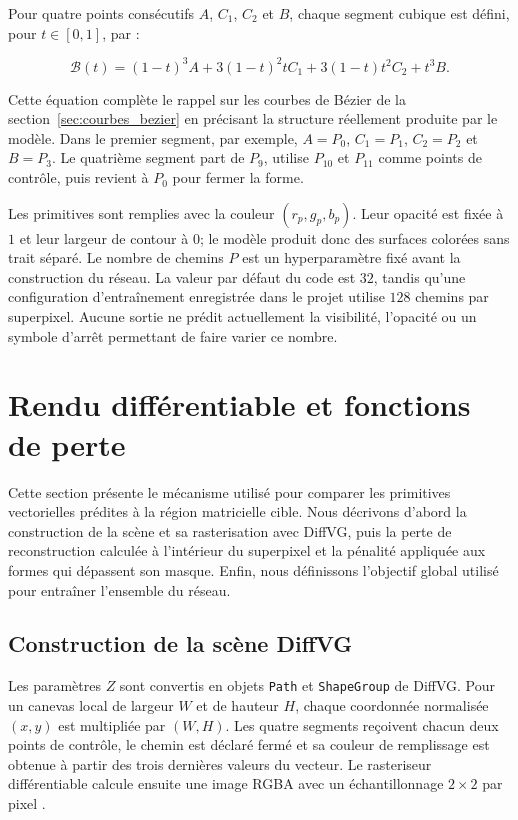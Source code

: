 \documentclass[12pt, a4paper, oneside]{report}
\begin{document}
Pour quatre points consécutifs $A$, $C_1$, $C_2$ et $B$, chaque segment cubique est défini, pour $t \in [0,1]$, par :

\begin{equation}
    \mathcal{B}(t) = (1-t)^3A
    + 3(1-t)^2tC_1
    + 3(1-t)t^2C_2
    + t^3B.
    \label{eq:bezier_cubique_approche}
\end{equation}

Cette équation complète le rappel sur les courbes de Bézier de la section~\ref{sec:courbes_bezier} en précisant la structure réellement produite par le modèle. Dans le premier segment, par exemple, $A=P_0$, $C_1=P_1$, $C_2=P_2$ et $B=P_3$. Le quatrième segment part de $P_9$, utilise $P_{10}$ et $P_{11}$ comme points de contrôle, puis revient à $P_0$ pour fermer la forme.

Les primitives sont remplies avec la couleur $(r_p,g_p,b_p)$. Leur opacité est fixée à $1$ et leur largeur de contour à $0$; le modèle produit donc des surfaces colorées sans trait séparé. Le nombre de chemins $P$ est un hyperparamètre fixé avant la construction du réseau. La valeur par défaut du code est $32$, tandis qu'une configuration d'entraînement enregistrée dans le projet utilise $128$ chemins par superpixel. Aucune sortie ne prédit actuellement la visibilité, l'opacité ou un symbole d'arrêt permettant de faire varier ce nombre.

\section{Rendu différentiable et fonctions de perte}
\label{sec:rendu_pertes_approche}

Cette section présente le mécanisme utilisé pour comparer les primitives vectorielles prédites à la région matricielle cible. Nous décrivons d'abord la construction de la scène et sa rasterisation avec DiffVG, puis la perte de reconstruction calculée à l'intérieur du superpixel et la pénalité appliquée aux formes qui dépassent son masque. Enfin, nous définissons l'objectif global utilisé pour entraîner l'ensemble du réseau.

\subsection{Construction de la scène DiffVG}

Les paramètres $Z$ sont convertis en objets \texttt{Path} et \texttt{ShapeGroup} de DiffVG. Pour un canevas local de largeur $W$ et de hauteur $H$, chaque coordonnée normalisée $(x,y)$ est multipliée par $(W,H)$. Les quatre segments reçoivent chacun deux points de contrôle, le chemin est déclaré fermé et sa couleur de remplissage est obtenue à partir des trois dernières valeurs du vecteur. Le rasteriseur différentiable calcule ensuite une image RGBA avec un échantillonnage $2 \times 2$ par pixel \cite{li2020diffvg}.
\end{document}

